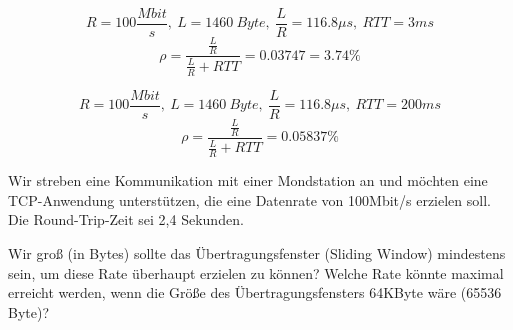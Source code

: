 

\begin{equation}
    R = 100 \frac{Mbit}{s},\ L = 1460\ Byte,\ \frac{L}{R}=116.8\mu s,\ RTT = 3ms
    \label{eq:equation}
\end{equation}
\begin{equation}
    \rho = \frac {\frac{L}{R}} {\frac{L}{R} + RTT} = 0.03747 = 3.74\%
    \label{eq:equation2}
\end{equation}


\begin{equation}
    R = 100 \frac{Mbit}{s},\ L = 1460\ Byte,\ \frac{L}{R}=116.8\mu s,\ RTT = 200ms
    \label{eq:equation3}
\end{equation}
\begin{equation}
    \rho = \frac {\frac{L}{R}} {\frac{L}{R} + RTT} = 0.05837\%
    \label{eq:equation4}
\end{equation}

Wir streben eine Kommunikation mit einer Mondstation an und möchten eine TCP-Anwendung unterstützen, die eine Datenrate von 100Mbit/s erzielen soll.
Die Round-Trip-Zeit sei 2,4 Sekunden.

Wir groß (in Bytes) sollte das Übertragungsfenster (Sliding Window) mindestens sein, um diese Rate überhaupt erzielen zu können?
Welche Rate könnte maximal erreicht werden, wenn die Größe des Übertragungsfensters 64KByte wäre (65536 Byte)?